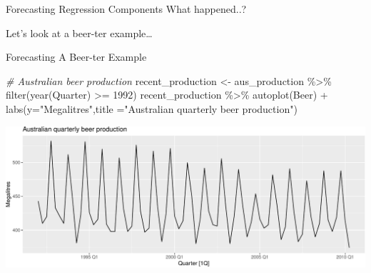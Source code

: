 \documentclass[
  ignorenonframetext,
]{beamer}
\newenvironment{Shaded}{\begin{snugshade}}{\end{snugshade}}
\newcommand{\AttributeTok}[1]{\textcolor[rgb]{0.77,0.63,0.00}{#1}}
\newcommand{\CommentTok}[1]{\textcolor[rgb]{0.56,0.35,0.01}{\textit{#1}}}
\newcommand{\DecValTok}[1]{\textcolor[rgb]{0.00,0.00,0.81}{#1}}
\newcommand{\FunctionTok}[1]{\textcolor[rgb]{0.00,0.00,0.00}{#1}}
\newcommand{\NormalTok}[1]{#1}
\newcommand{\OtherTok}[1]{\textcolor[rgb]{0.56,0.35,0.01}{#1}}
\newcommand{\SpecialCharTok}[1]{\textcolor[rgb]{0.00,0.00,0.00}{#1}}
\newcommand{\StringTok}[1]{\textcolor[rgb]{0.31,0.60,0.02}{#1}}
\begin{document}
\begin{frame}{Forecasting \textbar{} \small Regression Components}
\protect\hypertarget{forecasting-regression-components-3}{}
\center What happened..?

\pause

\center Let's look at a beer-ter example\ldots{}
\end{frame}

\begin{frame}[fragile]{Forecasting \textbar{} \small A Beer-ter Example}
\protect\hypertarget{forecasting-a-beer-ter-example}{}
\tiny

\begin{Shaded}
\begin{Highlighting}[]
\CommentTok{\# Australian beer production}
\NormalTok{recent\_production }\OtherTok{\textless{}{-}}\NormalTok{ aus\_production }\SpecialCharTok{\%\textgreater{}\%} \FunctionTok{filter}\NormalTok{(}\FunctionTok{year}\NormalTok{(Quarter) }\SpecialCharTok{\textgreater{}=} \DecValTok{1992}\NormalTok{)}
\NormalTok{recent\_production }\SpecialCharTok{\%\textgreater{}\%} \FunctionTok{autoplot}\NormalTok{(Beer) }\SpecialCharTok{+}
  \FunctionTok{labs}\NormalTok{(}\AttributeTok{y=}\StringTok{"Megalitres"}\NormalTok{,}\AttributeTok{title =}\StringTok{"Australian quarterly beer production"}\NormalTok{)}
\end{Highlighting}
\end{Shaded}

\includegraphics{Time-series-regression-models_files/figure-beamer/unnamed-chunk-41-1.pdf}

\normalfont
\end{frame}
\end{document}
